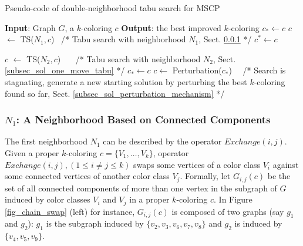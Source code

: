 \documentclass{elsart}
\begin{document}
\begin{algorithm}[h]
\begin{small}
 \caption{Pseudo-code of double-neighborhood tabu search for MSCP}\label{Algo_tabu}
 \begin{algorithmic}[1]
   \STATE \sf \textbf{Input}: Graph $G$, a $k$-coloring $c$
   \STATE \textbf{Output}: the best improved $k$-coloring
   \STATE $c_* \leftarrow c$  
       \REPEAT
            \STATE  $c$ $\leftarrow$ TS($N_1, c$)   \   /* Tabu search with neighborhood $N_1$, Sect. \ref{SectN2} */
                   \STATE $c^* \leftarrow c$                  
          \ENDIF

          \STATE $c$ $\leftarrow$ TS($N_2, c$)     \ \ \ /* Tabu search with neighborhood $N_2$, Sect.  \ref{subsec_sol_one_move_tabu} */
                   \STATE $c_* \leftarrow c$                  
          \ENDIF
     \STATE $c \leftarrow$ Perturbation($c_*$)            \ \ /* Search is stagnating, generate a new starting solution by perturbing the best $k$-coloring found so far, Sect. \ref{subsec_sol_perturbation_mechanism} */
   \ENDWHILE

 \end{algorithmic}
 \end{small}
\end{algorithm}













\subsubsection{$N_1$: A Neighborhood Based on Connected Components}
\label{SectN2}

The first neighborhood $N_1$ can be described by the operator $Exchange(i,j)$. Given a proper $k$-coloring $c = \{V_1, \ldots, V_k\}$, operator $Exchange(i,j), (1 \le i \neq j \le k)$ swaps some vertices of a color class $V_i$ against some connected vertices of another color class $V_j$. Formally, let $G_{i, j}(c)$ be the set of all connected components of more than one vertex in the subgraph of $G$ induced by color classes $V_i$ and $V_j$ in a proper $k$-coloring $c$. In Figure \ref{fig_chain_swap} (left) for instance, $G_{i, j}(c)$ is composed of two graphs (say $g_1$ and $g_2$): $g_1$ is the subgraph induced by $\{v_2, v_3, v_6, v_7, v_8\}$ and $g_2$ is induced by $\{v_4, v_5, v_9\}$.
\end{document}

